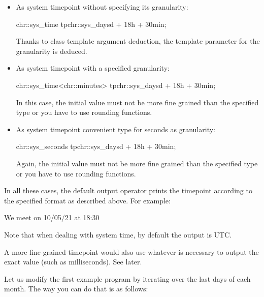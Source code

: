 \begin{itemize}
\item 
As system timepoint without specifying its granularity:

\begin{cpp}
chr::sys_time tp{chr::sys_days{d} + 18h + 30min};
\end{cpp}

Thanks to class template argument deduction, the template parameter for the granularity is deduced.

\item
As system timepoint with a specified granularity:

\begin{cpp}
chr::sys_time<chr::minutes> tp{chr::sys_days{d} + 18h + 30min};
\end{cpp}

In this case, the initial value must not be more fine grained than the specified type or you have to use rounding functions.

\item
As system timepoint convenient type for seconds as granularity:

\begin{cpp}
chr::sys_seconds tp{chr::sys_days{d} + 18h + 30min};
\end{cpp}

Again, the initial value must not be more fine grained than the specified type or you have to use rounding functions.
\end{itemize}

In all these cases, the default output operator prints the timepoint according to the specified format as described above. For example:

\begin{shell}
We meet on 10/05/21 at 18:30
\end{shell}

Note that when dealing with system time, by default the output is UTC.

A more fine-grained timepoint would also use whatever is necessary to output the exact value (such as milliseconds). See later.


Let us modify the first example program by iterating over the last days of each month. The way you can do that is as follows:




